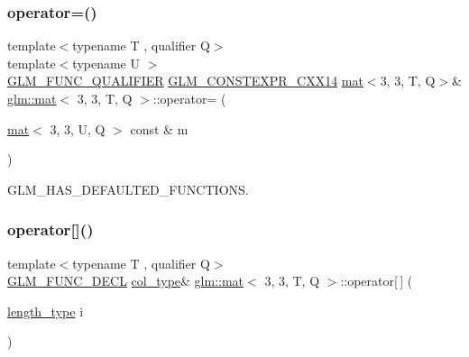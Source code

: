 \subsubsection{\texorpdfstring{operator=()}{operator=()}\hspace{0.1cm}{\footnotesize\ttfamily [3/3]}}
{\footnotesize\ttfamily template$<$typename T , qualifier Q$>$ \\
template$<$typename U $>$ \\
\hyperlink{setup_8hpp_a33fdea6f91c5f834105f7415e2a64407}{G\+L\+M\+\_\+\+F\+U\+N\+C\+\_\+\+Q\+U\+A\+L\+I\+F\+I\+ER} \hyperlink{setup_8hpp_a4dd12abf5e1164bc57f3a34671d03844}{G\+L\+M\+\_\+\+C\+O\+N\+S\+T\+E\+X\+P\+R\+\_\+\+C\+X\+X14} \hyperlink{structglm_1_1mat}{mat}$<$3, 3, T, Q$>$\& \hyperlink{structglm_1_1mat}{glm\+::mat}$<$ 3, 3, T, Q $>$\+::operator= (\begin{DoxyParamCaption}\item[{\hyperlink{structglm_1_1mat}{mat}$<$ 3, 3, U, Q $>$ const \&}]{m }\end{DoxyParamCaption})}



G\+L\+M\+\_\+\+H\+A\+S\+\_\+\+D\+E\+F\+A\+U\+L\+T\+E\+D\+\_\+\+F\+U\+N\+C\+T\+I\+O\+NS. 

\mbox{\label{structglm_1_1mat_3_013_00_013_00_01_t_00_01_q_01_4_a2507891a0a3b6c233c4f8a58071a7d9e}} 
\subsubsection{\texorpdfstring{operator[]()}{operator[]()}\hspace{0.1cm}{\footnotesize\ttfamily [1/2]}}
{\footnotesize\ttfamily template$<$typename T , qualifier Q$>$ \\
\hyperlink{setup_8hpp_ab2d052de21a70539923e9bcbf6e83a51}{G\+L\+M\+\_\+\+F\+U\+N\+C\+\_\+\+D\+E\+CL} \hyperlink{structglm_1_1mat_3_013_00_013_00_01_t_00_01_q_01_4_a4d84bef3685131dbb0ac43cac0a3b147}{col\+\_\+type}\& \hyperlink{structglm_1_1mat}{glm\+::mat}$<$ 3, 3, T, Q $>$\+::operator\mbox{[}$\,$\mbox{]} (\begin{DoxyParamCaption}\item[{\hyperlink{structglm_1_1mat_3_013_00_013_00_01_t_00_01_q_01_4_ae1b8524f20936516a48384a2841b5b9d}{length\+\_\+type}}]{i }\end{DoxyParamCaption})}

